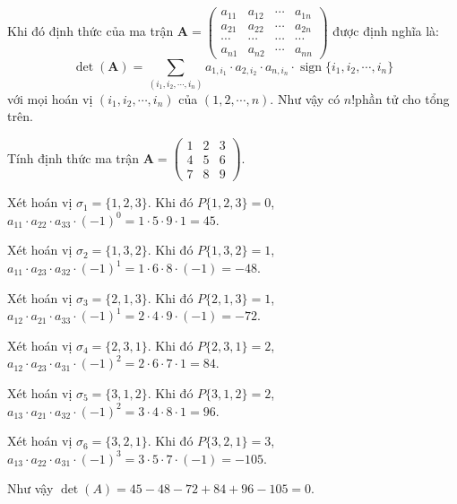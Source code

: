 \documentclass{mynotes}
\DeclareMathOperator{\sign}{sign}
\begin{document}
\begin{definition}
    Khi đó định thức của ma trận $\bm{A} = \begin{pmatrix}a_{11} & a_{12} & \cdots & a_{1n} \\ a_{21} & a_{22} & \cdots & a_{2n} \\ \cdots & \cdots & \cdots & \cdots \\ a_{n1} & a_{n2} & \cdots & a_{nn}\end{pmatrix}$ được định nghĩa là:
    \begin{equation}
        \det(\bm{A})=\displaystyle{\sum_{(i_1, i_2, \cdots, i_n)} a_{1, i_1} \cdot a_{2, i_2} \cdot a_{n, i_n} \cdot \sign\{i_1, i_2, \cdots, i_n\}}
    \end{equation}
    với mọi hoán vị $(i_1, i_2, \cdots, i_n)$ của $(1, 2, \cdots, n)$. Như vậy có $n!$​ phần tử cho tổng trên.
\end{definition}


\begin{example}
    Tính định thức ma trận $\bm{A}=\begin{pmatrix}1 & 2 & 3 \\ 4 & 5 & 6 \\ 7 & 8 & 9\end{pmatrix}$​.

    Xét hoán vị $\sigma_1 = \{1, 2, 3\}$​. Khi đó $P\{1, 2, 3\}=0$​, $a_{11} \cdot a_{22} \cdot a_{33} \cdot (-1)^0 = 1 \cdot 5 \cdot 9 \cdot 1 = 45$​.

    Xét hoán vị $\sigma_2 = \{1, 3, 2\}$​. Khi đó $P\{1, 3, 2\} = 1$​, $a_{11} \cdot a_{23} \cdot a_{32} \cdot (-1)^1 = 1 \cdot 6 \cdot 8 \cdot (-1) = -48$.

    Xét hoán vị $\sigma_3 = \{2, 1, 3\}$​. Khi đó $P\{2,1,3\}=1$​, $a_{12} \cdot a_{21} \cdot a_{33} \cdot (-1)^1 = 2 \cdot 4 \cdot 9 \cdot (-1) = -72$.

    Xét hoán vị $\sigma_4=\{2,3,1\}$. Khi đó $P\{2, 3, 1\} = 2$​, $a_{12} \cdot a_{23} \cdot a_{31} \cdot (-1)^2 = 2 \cdot 6 \cdot 7 \cdot 1 = 84$​.

    Xét hoán vị $\sigma_5=\{3, 1, 2\}$. Khi đó $P\{3, 1, 2\} = 2$​, $a_{13} \cdot a_{21} \cdot a_{32} \cdot (-1)^2 = 3 \cdot 4 \cdot 8 \cdot 1 = 96$​.

    Xét hoán vị $\sigma_6=\{3, 2, 1\}$​. Khi đó $P\{3, 2, 1\}=3$​, $a_{13} \cdot a_{22} \cdot a_{31} \cdot (-1)^3 = 3 \cdot 5 \cdot 7 \cdot  (-1) = -105$​.

    Như vậy $\det(A)=45-48-72+84+96-105=0$​.
\end{example}
\end{document}
